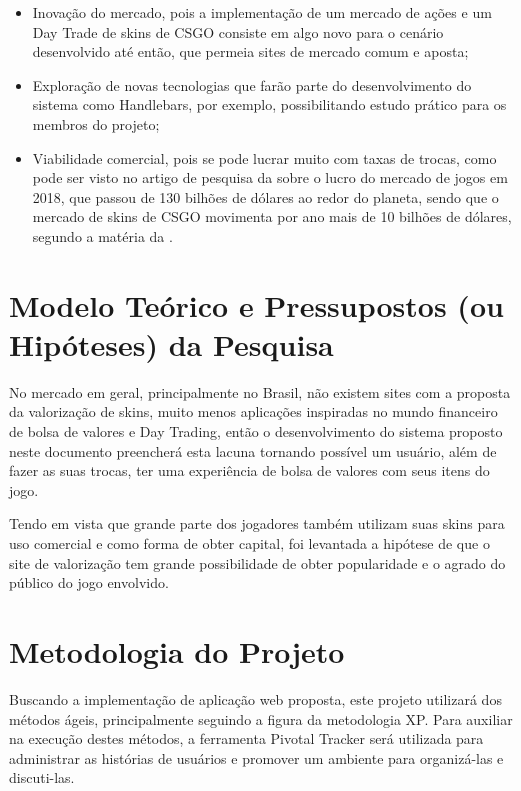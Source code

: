 \begin{itemize}
	\item Inovação do mercado, pois a implementação de um mercado de ações e um Day Trade de skins de CSGO consiste em algo novo para o cenário desenvolvido até então, que permeia sites de mercado comum e aposta;
	\item Exploração de novas tecnologias que farão parte do desenvolvimento do sistema como Handlebars, por exemplo, possibilitando estudo prático para os membros do projeto;
	\item Viabilidade comercial, pois se pode lucrar muito com taxas de trocas, como pode ser visto no artigo de pesquisa da  sobre o lucro do mercado de jogos em 2018, que passou de 130 bilhões de dólares ao redor do planeta, sendo que o mercado de skins de CSGO movimenta por ano mais de 10 bilhões de dólares, segundo a matéria da .
\end{itemize} 

\chapter{Modelo Teórico e Pressupostos (ou Hipóteses) da Pesquisa}
No mercado em geral, principalmente no Brasil, não existem sites com a proposta da valorização de skins, muito menos aplicações inspiradas no mundo financeiro de bolsa de valores e Day Trading, então o desenvolvimento do sistema proposto neste documento preencherá esta lacuna tornando possível um usuário, além de fazer as suas trocas, ter uma experiência de bolsa de valores com seus itens do jogo. 

Tendo em vista que grande parte dos jogadores também utilizam suas skins para uso comercial e como forma de obter capital, foi levantada a hipótese de que o site de valorização tem grande possibilidade de obter popularidade e o agrado do público do jogo envolvido.

\chapter{Metodologia do Projeto}
Buscando a implementação de aplicação web proposta, este projeto utilizará dos métodos ágeis, principalmente seguindo a figura da metodologia XP. Para auxiliar na execução destes métodos, a ferramenta Pivotal Tracker será utilizada para administrar as histórias de usuários e promover um ambiente para organizá-las e discuti-las.

